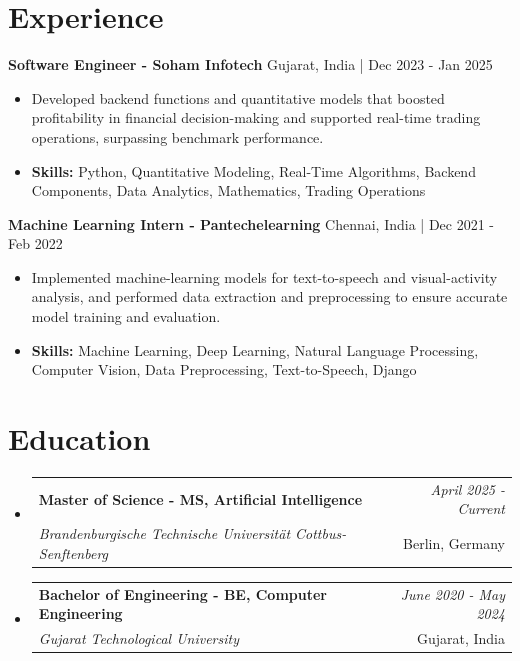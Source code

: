 \documentclass[a4paper,11pt]{article}
\makeatletter
\newcommand{\resumeSubheading}[4]{
\vspace{0.5mm}\item
    \begin{tabular*}{\linewidth}[t]{l@{\extracolsep{\fill}}r}
        \textbf{#1} & \textit{\footnotesize{#4}} \\
        \textit{\footnotesize{#3}} &  \footnotesize{#2}\\
    \end{tabular*}
    \vspace{-2.4mm}
}
\makeatother
\begin{document}
\section{\textbf{Experience}}


\vspace{1mm}
  \textbf{Software Engineer - Soham Infotech} \hfill Gujarat, India | Dec 2023 - Jan 2025
\vspace{-1.5mm} %
\begin{itemize}
  \item Developed backend functions and quantitative models that boosted profitability in financial decision-making and supported real-time trading operations, surpassing benchmark performance.

\vspace{-2mm}
  \item \textbf{Skills:} Python, Quantitative Modeling, Real-Time Algorithms, Backend Components, Data Analytics, Mathematics, Trading Operations
\end{itemize}

\vspace{1mm}
  \textbf{Machine Learning Intern - Pantechelearning} \hfill Chennai, India | Dec 2021 - Feb 2022
\vspace{-1.5mm} %
\begin{itemize}
  \item Implemented machine-learning models for text-to-speech and visual-activity analysis, and performed data extraction and preprocessing to ensure accurate model training and evaluation.
\vspace{-2mm}
  \item \textbf{Skills:} Machine Learning, Deep Learning, Natural Language Processing, Computer Vision, Data Preprocessing, Text-to-Speech, Django
\end{itemize}\section{\textbf{Education}}
\vspace{-0.4mm}

\begin{itemize}[leftmargin=0.15in, label={}]
\resumeSubheading
{Master of Science - MS, Artificial Intelligence }{Berlin, Germany}
{Brandenburgische Technische Universität Cottbus-Senftenberg  }{April 2025 - Current}

\vspace{1.0mm} %
\resumeSubheading
{Bachelor of Engineering - BE, Computer Engineering  }{Gujarat, India}
{Gujarat Technological University }{June 2020 - May 2024}

\end{itemize}
\end{document}
